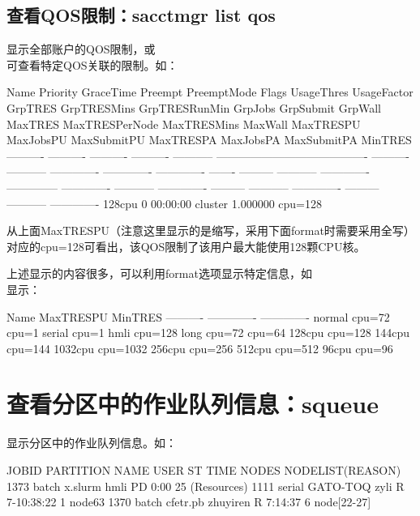 \subsection{查看QOS限制：sacctmgr list qos}
显示全部账户的QOS限制，或\\可查看特定QOS关联的限制。如：
\begin{OUT}
      Name   Priority  GraceTime    Preempt PreemptMode                                    Flags UsageThres UsageFactor       GrpTRES   GrpTRESMins GrpTRESRunMin GrpJobs GrpSubmit     GrpWall       MaxTRES MaxTRESPerNode   MaxTRESMins     MaxWall     MaxTRESPU MaxJobsPU MaxSubmitPU     MaxTRESPA MaxJobsPA MaxSubmitPA       MinTRES
---------- ---------- ---------- ---------- ----------- ---------------------------------------- ---------- ----------- ------------- ------------- ------------- ------- --------- ----------- ------------- -------------- ------------- ----------- ------------- --------- ----------- ------------- --------- ----------- -------------
    128cpu          0   00:00:00                cluster                                                        1.000000                                                                                                                                      cpu=128
\end{OUT}

从上面MaxTRESPU（注意这里显示的是缩写，采用下面format时需要采用全写）对应的cpu=128可看出，该QOS限制了该用户最大能使用128颗CPU核。

上述显示的内容很多，可以利用format选项显示特定信息，如\\显示：
\begin{OUT}
      Name     MaxTRESPU       MinTRES
---------- ------------- -------------
    normal        cpu=72         cpu=1
    serial                       cpu=1
      hmli       cpu=128
      long        cpu=72        cpu=64
    128cpu       cpu=128
    144cpu       cpu=144
   1032cpu      cpu=1032
    256cpu       cpu=256
    512cpu       cpu=512
     96cpu        cpu=96
\end{OUT}

\section{查看分区中的作业队列信息：squeue}
显示分区中的作业队列信息。如：
\begin{OUT}
JOBID PARTITION     NAME     USER ST       TIME  NODES NODELIST(REASON)
 1373     batch  x.slurm     hmli PD       0:00     25 (Resources)
 1111    serial GATO-TOQ     zyli  R 7-10:38:22      1 node63
 1370     batch cfetr.pb zhuyiren  R    7:14:37      6 node[22-27]
\end{OUT}

